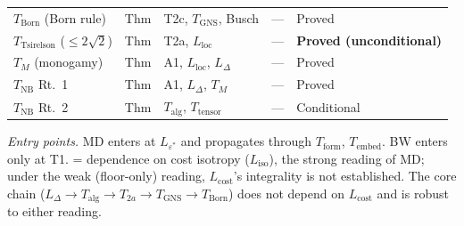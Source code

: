 \documentclass[11pt]{article}
\begin{document}
\begin{center}
\begin{tabular}{@{}lclcl@{}}
$T_{\mathrm{Born}}$ (Born rule) & Thm & T2c, $T_{\mathrm{GNS}}$, Busch & --- & Proved \\
$T_{\mathrm{Tsirelson}}$ ($\le 2\sqrt{2}$) & Thm & T2a, $L_{\mathrm{loc}}$ & --- & \textbf{Proved (unconditional)} \\
$T_M$ (monogamy) & Thm & A1, $L_{\mathrm{loc}}$, $L_\Delta$ & --- & Proved \\
$T_{\mathrm{NB}}$ Rt.~1 & Thm & A1, $L_\Delta$, $T_M$ & --- & Proved \\
$T_{\mathrm{NB}}$ Rt.~2 & Thm & $T_{\mathrm{alg}}$, $T_{\mathrm{tensor}}$ & --- & Conditional \\
\bottomrule
\end{tabular}
\end{center}

\noindent\textit{Entry points.}  MD enters at $L_{\varepsilon^*}$ and propagates through $T_{\mathrm{form}}$, $T_{\mathrm{embed}}$.  BW enters only at T1.   = dependence on cost isotropy ($L_{\mathrm{iso}}$), the strong reading of MD; under the weak (floor-only) reading, $L_{\mathrm{cost}}$'s integrality is not established.  The core chain ($L_\Delta \to T_{\mathrm{alg}} \to T_{2a} \to T_{\mathrm{GNS}} \to T_{\mathrm{Born}}$) does not depend on $L_{\mathrm{cost}}$ and is robust to either reading.
\end{document}
